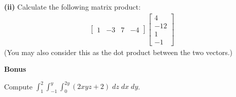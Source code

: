 \documentclass[12pt]{amsbook}
\newcommand{\DD}{\displaystyle}
\begin{document}
\textbf{(ii)} Calculate the following matrix product:
\begin{align*}
\left[\begin{array}{rlrl} 1 & -3 & 7 & -4 \end{array}\right] \left[\begin{array}{r}
4 \\ -12 \\ 1 \\ -1
\end{array}\right]
\end{align*}
(You may also consider this as the dot product between the two vectors.)


















\newpage

\textbf{Bonus} 

\vspace{.25cm}

Compute $\DD \int_1^2 \int_{-1}^y \int_0^{2y} (2xyz+2) \; dz \; dx \; dy$.
\end{document}
